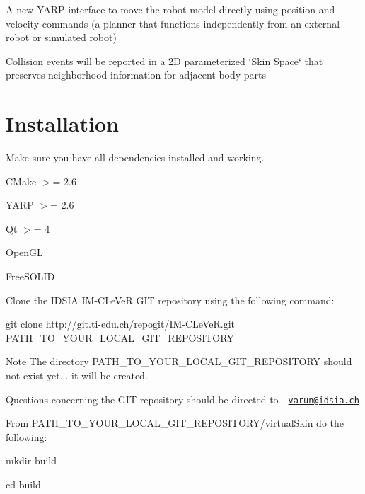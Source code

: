 \begin{DoxyItemize}
\item A new YARP interface to move the robot model directly using position and velocity commands (a planner that functions independently from an external robot or simulated robot)
\item Collision events will be reported in a 2D parameterized \char`\"{}Skin Space\char`\"{} that preserves neighborhood information for adjacent body parts
\end{DoxyItemize}\hypertarget{index_install}{}\section{Installation}\label{index_install}

\begin{DoxyEnumerate}
\item Make sure you have all dependencies installed and working.
\begin{DoxyItemize}
\item CMake $>$= 2.6
\item YARP $>$= 2.6
\item Qt $>$= 4
\item OpenGL
\item FreeSOLID
\end{DoxyItemize}
\item Clone the IDSIA IM-\/CLeVeR GIT repository using the following command: \begin{DoxyVerb}git clone http://git.ti-edu.ch/repogit/IM-CLeVeR.git PATH_TO_YOUR_LOCAL_GIT_REPOSITORY \end{DoxyVerb}
 \begin{DoxyNote}{Note}
The directory PATH\_\-TO\_\-YOUR\_\-LOCAL\_\-GIT\_\-REPOSITORY should not exist yet... it will be created. 

Questions concerning the GIT repository should be directed to -\/ \href{mailto:varun@idsia.ch}{\tt varun@idsia.ch}
\end{DoxyNote}

\item From PATH\_\-TO\_\-YOUR\_\-LOCAL\_\-GIT\_\-REPOSITORY/virtualSkin do the following:
\begin{DoxyItemize}
\item \begin{DoxyVerb}mkdir build \end{DoxyVerb}

\item \begin{DoxyVerb}cd build \end{DoxyVerb}


\end{DoxyItemize}
\end{DoxyEnumerate}
